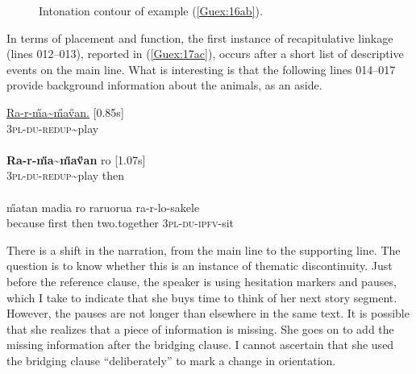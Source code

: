 \documentclass[output=paper]{LSP/langsci}
\begin{document}
\begin{figure}[ht]
\caption{Intonation contour of example (\ref{Guex:16ab}). \label{GuF6}}
\end{figure}


In terms of placement and function, the first instance of recapitulative linkage (lines 012--013), reported in (\ref{Guex:17ac}), occurs after a short list of descriptive events on the main line. What is interesting is that the following lines 014--017 provide background information about the animals, as an aside. 

\begin{exe}
\ex \label{Guex:17ac}
\begin{xlist}
\ex \label{Guex:17a}
\gll \underline{Ra-r-\H{m}a{\textasciitilde}\H{m}a\H{v}an.}           [0.85s]\\
\textsc{3pl-du-redup}{\textasciitilde}play \\
\glt {}\\
\ex \label{Guex:17b}
\gll \textbf{Ra-r-\H{m}a{\textasciitilde}\H{m}a\H{v}an}              ro [1.07s]\\
\textsc{3pl-du-redup}{\textasciitilde}play   then\\
\glt {}\\
\ex \label{Guex:17c}
\gll   \H{m}atan     madia ro raruorua ra-r-lo-sakele\\     	       
 because   first then two.together \textsc{3pl-du-ipfv}-sit\\
\glt {} 
\end{xlist}
\end{exe}

There is a shift in the narration, from the main line to the supporting line. The question is to know whether this is an instance of thematic discontinuity. Just before the reference clause, the speaker is using hesitation markers and pauses, which I take to indicate that she buys time to think of her next story segment. However, the pauses are not longer than elsewhere in the same text. It is possible that she realizes that a piece of information is missing. She goes on to add the missing information after the bridging clause. I cannot ascertain that she used the bridging clause ``deliberately'' to mark a change in orientation. 
\end{document}
